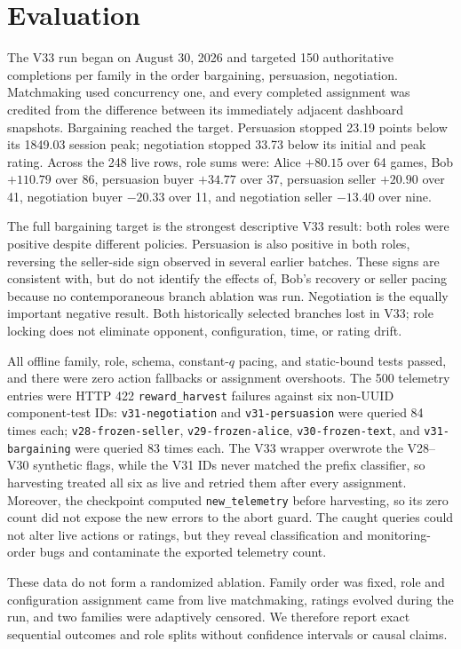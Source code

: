 \section{Evaluation}



The V33 run began on August 30, 2026 and targeted 150 authoritative completions
per family in the order bargaining, persuasion, negotiation. Matchmaking used
concurrency one, and every completed assignment was credited from the difference
between its immediately adjacent dashboard snapshots. Bargaining reached the
target. Persuasion stopped 23.19 points below its 1849.03 session peak;
negotiation stopped 33.73 below its initial and peak rating. Across the 248 live
rows, role sums were: Alice $+80.15$ over 64 games, Bob $+110.79$ over 86,
persuasion buyer $+34.77$ over 37, persuasion seller $+20.90$ over 41,
negotiation buyer $-20.33$ over 11, and negotiation seller $-13.40$ over nine.

The full bargaining target is the strongest descriptive V33 result: both roles
were positive despite different policies. Persuasion is also positive in both
roles, reversing the seller-side sign observed in several earlier batches.
These signs are consistent with, but do not identify the effects of, Bob's
recovery or seller pacing because no contemporaneous branch ablation was run.
Negotiation is the equally important negative result. Both historically selected
branches lost in V33; role locking does not eliminate opponent, configuration,
time, or rating drift.

All offline family, role, schema, constant-$q$ pacing, and static-bound tests
passed, and there were zero action fallbacks or assignment overshoots. The 500
telemetry entries were HTTP 422 \texttt{reward\_harvest} failures against six
non-UUID component-test IDs: \texttt{v31-negotiation} and
\texttt{v31-persuasion} were queried 84 times each; \texttt{v28-frozen-seller},
\texttt{v29-frozen-alice}, \texttt{v30-frozen-text}, and
\texttt{v31-bargaining} were queried 83 times each. The V33 wrapper overwrote
the V28--V30 synthetic flags, while the V31 IDs never matched the prefix
classifier, so harvesting treated all six as live and retried them after every
assignment. Moreover, the checkpoint computed
\texttt{new\_telemetry} before harvesting, so its zero count did not expose the
new errors to the abort guard. The caught queries could not alter live actions
or ratings, but they reveal classification and monitoring-order bugs and
contaminate the exported telemetry count.

These data do not form a randomized ablation. Family order was fixed, role and
configuration assignment came from live matchmaking, ratings evolved during
the run, and two families were adaptively censored. We therefore report exact
sequential outcomes and role splits without confidence intervals or causal
claims.

